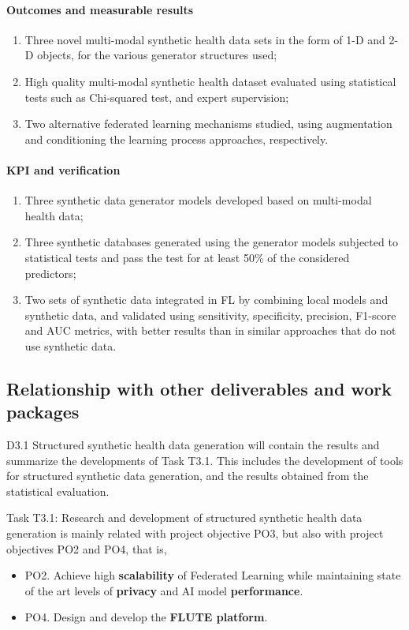 \documentclass[a4paper,12pt]{article}
\begin{document}
\paragraph{Outcomes and measurable results} 
\begin{enumerate}
    \item Three novel multi-modal synthetic health data sets in the form of 1-D and 2-D objects, for the various generator structures used;
    \item High quality multi-modal synthetic health dataset evaluated using statistical tests such as Chi-squared test, and expert supervision;
    \item Two alternative federated learning mechanisms studied, using augmentation and conditioning the learning process approaches, respectively.
\end{enumerate}

\paragraph{KPI and verification} \begin{enumerate}
    \item Three synthetic data generator models developed based on multi-modal health data;
    \item Three synthetic databases generated using the generator models subjected to statistical tests and pass the test for at least 50\% of the considered predictors;
    \item Two sets of synthetic data integrated in FL by combining local models and synthetic data, and validated using sensitivity, specificity, precision, F1-score and AUC metrics, with better results than in similar approaches that do not use synthetic data.
\end{enumerate}

\subsection{Relationship with other deliverables and work packages} 

D3.1 Structured synthetic health data generation will contain the results and summarize the
developments of Task T3.1. This includes the development of tools for structured synthetic data
generation, and the results obtained from the statistical evaluation.

Task T3.1: Research and development of structured synthetic health data generation is mainly related with project objective PO3, but also with project objectives PO2 and PO4, that is, 
\begin{itemize}
    \item PO2. Achieve high \textbf{scalability} of Federated Learning while maintaining state of the art levels of \textbf{privacy} and AI model \textbf{performance}.
    \item PO4. Design and develop the \textbf{FLUTE platform}.
\end{itemize}
\end{document}
